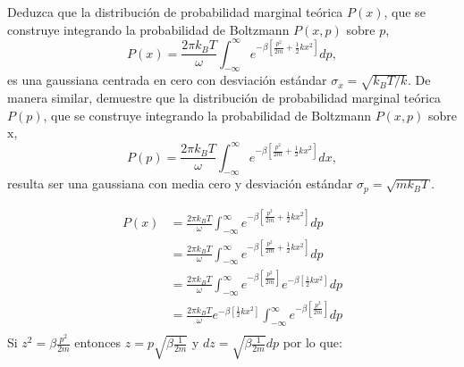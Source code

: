 \documentclass[a4paper]{article}
\begin{document}
    Deduzca que la distribución de probabilidad marginal teórica $P(x)$, que se construye integrando la probabilidad de Boltzmann $P(x, p)$ sobre $p$,
    $$
    P(x)=\frac{2 \pi k_B T}{\omega} \int_{-\infty}^{\infty} e^{-\beta\left[\frac{p^2}{2 m}+\frac{1}{2} k x^2\right]} d p,
    $$
    es una gaussiana centrada en cero con desviación estándar $\sigma_x=\sqrt{k_B T / k}$. De manera similar, demuestre que la distribución de probabilidad marginal teórica $P(p)$, que se construye integrando la probabilidad de Boltzmann $P(x, p)$ sobre $\mathrm{x}$,
    $$
    P(p)=\frac{2 \pi k_B T}{\omega} \int_{-\infty}^{\infty} e^{-\beta\left[\frac{p^2}{2 m}+\frac{1}{2} k x^2\right]} d x,
    $$
    resulta ser una gaussiana con media cero y desviación estándar $\sigma_p=\sqrt{m k_B T}$.

    \begin{answer}
        \begin{align*}
            P(x) &= \frac{2 \pi k_B T}{\omega} \int_{-\infty}^{\infty} e^{-\beta\left[\frac{p^2}{2 m}+\frac{1}{2} k x^2\right]} d p \\
            &= \frac{2 \pi k_B T}{\omega} \int_{-\infty}^{\infty} e^{-\beta\left[\frac{p^2}{2 m}+\frac{1}{2} k x^2\right]} d p \\
            &= \frac{2 \pi k_B T}{\omega} \int_{-\infty}^{\infty} e^{-\beta\left[\frac{p^2}{2 m}\right]} e^{-\beta\left[\frac{1}{2} k x^2\right]} d p \\
            &= \frac{2 \pi k_B T}{\omega} e^{-\beta\left[\frac{1}{2} k x^2\right]} \int_{-\infty}^{\infty} e^{-\beta\left[\frac{p^2}{2 m}\right]} d p \\
        \end{align*}
        Si $z^2 = \beta \frac{p^2}{2m}$ entonces $z= p\sqrt{\beta \frac{1}{2m}}$ y $d z = \sqrt{\beta \frac{1}{2m}} d p$ por lo que:


\end{answer}
\end{document}
